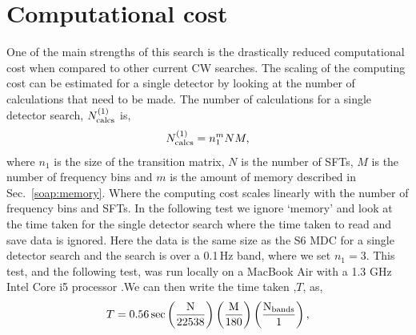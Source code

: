\clearpage

\section{\label{soap:results:time}Computational cost}

One of the main strengths of this search is the drastically reduced computational cost when compared to other current \gls{CW} searches.
The scaling of the computing cost can be estimated for a single detector by looking at the number of calculations that need to be made. 
The number of calculations for a single detector search, $N^{(1)}_{\rm{calcs}}$ is,
\begin{equation}
\label{soap:results:time:singlecalc}
N^{(1)}_{\rm{calcs}} = n_{1}^{m}NM,
\end{equation}
where $n_1$ is the size of the transition matrix, $N$ is the number of \glspl{SFT}, $M$ is the number of frequency bins and $m$ is the amount of memory described in Sec.~\ref{soap:memory}. Where the computing cost scales linearly with the number of frequency bins and \glspl{SFT}.
In the following test we ignore `memory' and look at the time taken for the single detector search where the time taken to read and save data is ignored. Here the data is the same size as the S6 \gls{MDC} for a single detector search and the search is over a 0.1\,Hz band, where we set $n_1=3$. This test, and the following test, was run locally on a MacBook Air with a 1.3 GHz Intel Core i5 processor .We can then write the time taken ,$T$, as,
%
\begin{equation}
T = 0.56\,\rm{sec}\left( \frac{N}{22538}\right) \left( \frac{M}{180}\right) \left( \frac{N_{\rm{bands}}}{1}\right),
\end{equation}

